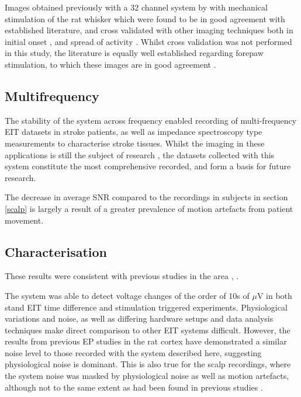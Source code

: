 Images obtained previously with a 32 channel system by \citet{Aristovich_2016} with mechanical stimulation of the rat whisker which were found to be in good agreement with established literature, and cross validated with other imaging techniques both in initial onset \cite{armstrong1991thalamo}, and spread of activity \cite{petersen2007functional}. Whilst cross validation was not performed in this study, the literature is equally well established regarding forepaw stimulation, to which these images are in good agreement \cite{peeters2001comparing} \cite{masamoto2007relationship} \cite{lowe2007small}.



\subsection{Multifrequency}
The stability of the system across frequency enabled recording of multi-frequency EIT datasets in stroke patients, as well as impedance spectroscopy type measurements to characterise stroke tissues. Whilst the imaging in these applications is still the subject of research \cite{malone2015} \cite{jang2015detection}, the datasets collected with this system constitute the most comprehensive recorded, and form a basis for future research. 

The decrease in average SNR compared to the recordings in subjects in section \ref{scalp} is largely a result of a greater prevalence of motion artefacts from patient movement. 
\subsection{Characterisation}



These results were consistent with previous studies in the area \cite{Ranck_1963}, \cite{Logothetis_2007}.



The system was able to detect voltage changes of the order of 10s of $\mu$V in both stand EIT time difference and stimulation triggered experiments. Physiological variations and noise, as well as differing hardware setups and data analysis techniques make direct comparison to other EIT systems difficult. However, the results from previous EP studies \cite{Oh2011} in the rat cortex have demonstrated a similar noise level to those recorded with the system described here, suggesting physiological noise is dominant. This is also true for the scalp recordings, where the system noise was masked by physiological noise as well as motion artefacts, although not to the same extent as had been found in previous studies \cite{Fabrizi_2006}. 








